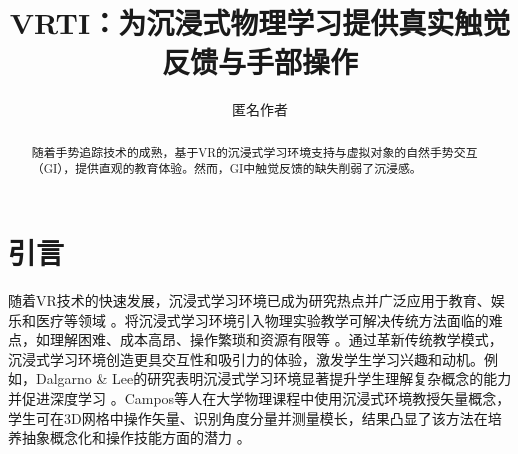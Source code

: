 \documentclass[runningheads]{llncs}
\begin{document}
\title{VRTI：为沉浸式物理学习提供真实触觉反馈与手部操作}

 


\author{匿名作者}

\maketitle

\begin{abstract}
随着手势追踪技术的成熟，基于VR的沉浸式学习环境支持与虚拟对象的自然手势交互（GI），提供直观的教育体验。然而，GI中触觉反馈的缺失削弱了沉浸感。

\end{abstract}

\section{引言}
随着VR技术的快速发展，沉浸式学习环境已成为研究热点并广泛应用于教育、娱乐和医疗等领域 \cite{luo2020dream,yeung2021virtual}。将沉浸式学习环境引入物理实验教学可解决传统方法面临的难点，如理解困难、成本高昂、操作繁琐和资源有限等 \cite{yang2007impact,abu2018design}。通过革新传统教学模式，沉浸式学习环境创造更具交互性和吸引力的体验，激发学生学习兴趣和动机。例如，Dalgarno \& Lee的研究表明沉浸式学习环境显著提升学生理解复杂概念的能力并促进深度学习 \cite{dalgarno2010learning}。Campos等人在大学物理课程中使用沉浸式环境教授矢量概念，学生可在3D网格中操作矢量、识别角度分量并测量模长，结果凸显了该方法在培养抽象概念化和操作技能方面的潜力 \cite{campos2022impact}。
\end{document}
